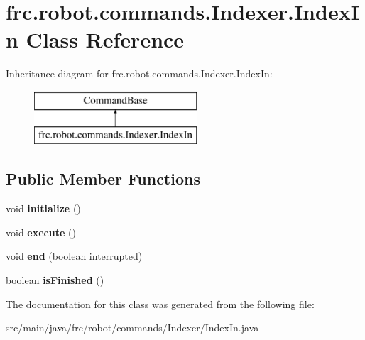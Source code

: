 \hypertarget{classfrc_1_1robot_1_1commands_1_1_indexer_1_1_index_in}{}\section{frc.\+robot.\+commands.\+Indexer.\+Index\+In Class Reference}
\label{classfrc_1_1robot_1_1commands_1_1_indexer_1_1_index_in}
Inheritance diagram for frc.\+robot.\+commands.\+Indexer.\+Index\+In\+:\begin{figure}[H]
\begin{center}
\leavevmode
\includegraphics[height=2.000000cm]{classfrc_1_1robot_1_1commands_1_1_indexer_1_1_index_in}
\end{center}
\end{figure}
\subsection*{Public Member Functions}
\begin{DoxyCompactItemize}
\item 
\mbox{\label{classfrc_1_1robot_1_1commands_1_1_indexer_1_1_index_in_a05fa06185a850eaa8689438eab6e2e80}} 
void {\bfseries initialize} ()
\item 
\mbox{\label{classfrc_1_1robot_1_1commands_1_1_indexer_1_1_index_in_a70d20f40de32607629401ff8480dd3ff}} 
void {\bfseries execute} ()
\item 
\mbox{\label{classfrc_1_1robot_1_1commands_1_1_indexer_1_1_index_in_aaeb35695f71e3a89e69b9bb00864f8e9}} 
void {\bfseries end} (boolean interrupted)
\item 
\mbox{\label{classfrc_1_1robot_1_1commands_1_1_indexer_1_1_index_in_a0e391026f07d2d305d42d25c6dbb661c}} 
boolean {\bfseries is\+Finished} ()
\end{DoxyCompactItemize}


The documentation for this class was generated from the following file\+:\begin{DoxyCompactItemize}
\item 
src/main/java/frc/robot/commands/\+Indexer/Index\+In.\+java\end{DoxyCompactItemize}
